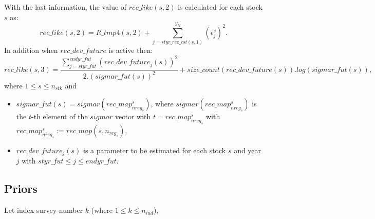 \documentclass{article}
\begin{document}
With the last information, the value of $rec\_like(s,2)$ is calculated for each stock $s$ as:
\begin{equation}
    rec\_like(s,2) = R\_tmp4(s,2) + \sum_{j=styr\_rec\_est(s,1)}^{y_N}( \epsilon^s_j)^2.
\end{equation}
In addition  when $rec\_dev\_future$ is active then: 
\begin{equation}
    rec\_like(s,3) = \dfrac{ \displaystyle\sum_{j=styr\_fut}^{endyr\_fut}(rec\_dev\_future_j(s))^2}{2.(sigmar\_fut(s))^2} + size\_count(rec\_dev\_future(s)).log(sigmar\_fut(s)), 
\end{equation}
where $1\leq s \leq n_{stk}$ and 
\begin{itemize}
    \item $sigmar\_fut(s)=sigmar(rec\_map^s_{nreg_s})$, where $sigmar(rec\_map^s_{nreg_s})$ is the $t$-th element of the $sigmar$ vector  with $t=rec\_map^s_{nreg_s}$ with  $rec\_map^s_{nreg_s}:=rec\_map(s,n_{reg_s})$,

    \item $rec\_dev\_future_j(s)$ is a parameter to be estimated for each stock $s$ and year $j$ with $styr\_fut \leq j \leq endyr\_fut$.
\end{itemize}


\subsection{Priors}

Let index survey number $k$ (where $1\leq k \leq n_{ind}$),
\end{document}
